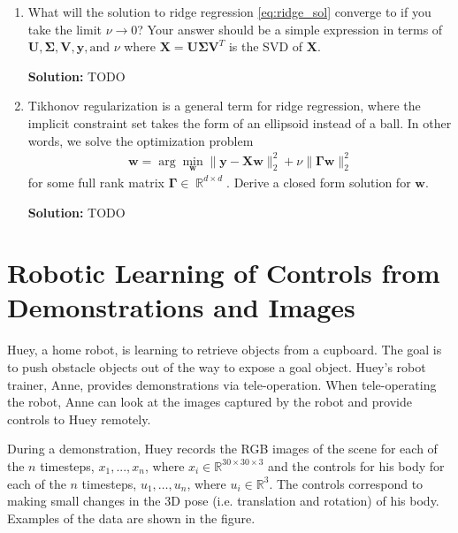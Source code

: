 \documentclass{article}
\newcommand{\mat}[1]{\mathbf{#1}}
\renewcommand{\vec}[1]{\boldsymbol{\mathbf{#1}}}
\newcommand{\Question}[1]{\Large \section{ #1 } \normalsize}
\DeclareMathOperator{\R}{\mathbb{R}}
\newenvironment{solution}{\color{blue} \smallskip \textbf{Solution:}}{}
\begin{document}
\begin{enumerate}
    \emph{Hint:} To make this point, it may be helpful to consider $\vec{w} = \vec{w}_0 + \vec{w}^*$ where $\vec{w}_0$ is in the null space of $\mat X$ and $\vec{w}^*$ is a solution.
    
    \begin{solution}
        TODO
    \end{solution}

    \newpage
    \item What will the solution to ridge regression \eqref{eq:ridge_sol} converge to if you take the limit $\nu \rightarrow 0$? Your answer should be a simple expression in terms of $\mat{U}, \mat{\Sigma}, \mat{V}, \vec{y}, \text{and } \nu$ where $\mat{X} = \mat{U}\mat{\Sigma}\mat{V}^{T}$ is the SVD of $\mat{X}$.
    
    \begin{solution}
        TODO
    \end{solution}

    \newpage
    \item Tikhonov regularization is a general term for ridge regression, where the implicit constraint set takes the form of an ellipsoid instead of a ball. In other words, we solve the optimization problem
    \begin{align*}
        \vec{w} = \arg\min_{\vec{w}} \|\vec{y} - \mat{X}\vec{w}\|_2^2 + \nu\|\mat{\Gamma}\vec{w}\|_2^2
    \end{align*}
    for some full rank matrix $\mat{\Gamma} \in \R^{d \times d}$. Derive a closed form solution for $\vec{w}$.
    
    \begin{solution}
        TODO
    \end{solution}

\end{enumerate}

\newpage
\Question{Robotic Learning of Controls from Demonstrations and Images}

Huey, a home robot, is learning to retrieve objects from a cupboard. The goal is to push obstacle objects out of the way to expose a goal object.  Huey's robot trainer, Anne, provides demonstrations via tele-operation. When tele-operating the robot, Anne can look at the images captured by the robot and provide controls to Huey remotely.

During a demonstration, Huey records the RGB images of the scene for each of the $n$ timesteps, $x_1,...,x_{n}$, where $x_i \in \mathbb{R}^{30\times 30\times 3}$ and the controls for his body for each of the $n$ timesteps, $u_1,\ldots,u_{n}$, where $u_i \in \mathbb{R}^3$. The controls correspond to making small changes in the 3D pose (i.e. translation and rotation) of his body. Examples of the data are shown in the figure. 
\end{document}
